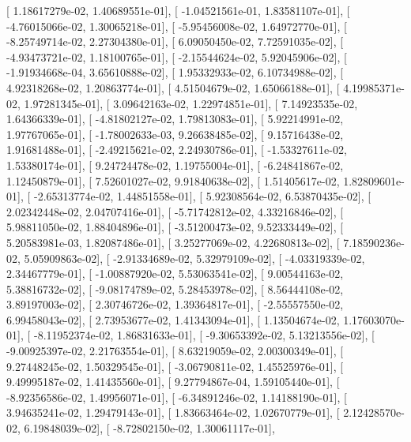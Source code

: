 \documentclass{article}
\begin{document}
       [  1.18617279e-02,   1.40689551e-01],
       [ -1.04521561e-01,   1.83581107e-01],
       [ -4.76015066e-02,   1.30065218e-01],
       [ -5.95456008e-02,   1.64972770e-01],
       [ -8.25749714e-02,   2.27304380e-01],
       [  6.09050450e-02,   7.72591035e-02],
       [ -4.93473721e-02,   1.18100765e-01],
       [ -2.15544624e-02,   5.92045906e-02],
       [ -1.91934668e-04,   3.65610888e-02],
       [  1.95332933e-02,   6.10734988e-02],
       [  4.92318268e-02,   1.20863774e-01],
       [  4.51504679e-02,   1.65066188e-01],
       [  4.19985371e-02,   1.97281345e-01],
       [  3.09642163e-02,   1.22974851e-01],
       [  7.14923535e-02,   1.64366339e-01],
       [ -4.81802127e-02,   1.79813083e-01],
       [  5.92214991e-02,   1.97767065e-01],
       [ -1.78002633e-03,   9.26638485e-02],
       [  9.15716438e-02,   1.91681488e-01],
       [ -2.49215621e-02,   2.24930786e-01],
       [ -1.53327611e-02,   1.53380174e-01],
       [  9.24724478e-02,   1.19755004e-01],
       [ -6.24841867e-02,   1.12450879e-01],
       [  7.52601027e-02,   9.91840638e-02],
       [  1.51405617e-02,   1.82809601e-01],
       [ -2.65313774e-02,   1.44851558e-01],
       [  5.92308564e-02,   6.53870435e-02],
       [  2.02342448e-02,   2.04707416e-01],
       [ -5.71742812e-02,   4.33216846e-02],
       [  5.98811050e-02,   1.88404896e-01],
       [ -3.51200473e-02,   9.52333449e-02],
       [  5.20583981e-03,   1.82087486e-01],
       [  3.25277069e-02,   4.22680813e-02],
       [  7.18590236e-02,   5.05909863e-02],
       [ -2.91334689e-02,   5.32979109e-02],
       [ -4.03319339e-02,   2.34467779e-01],
       [ -1.00887920e-02,   5.53063541e-02],
       [  9.00544163e-02,   5.38816732e-02],
       [ -9.08174789e-02,   5.28453978e-02],
       [  8.56444108e-02,   3.89197003e-02],
       [  2.30746726e-02,   1.39364817e-01],
       [ -2.55557550e-02,   6.99458043e-02],
       [  2.73953677e-02,   1.41343094e-01],
       [  1.13504674e-02,   1.17603070e-01],
       [ -8.11952374e-02,   1.86831633e-01],
       [ -9.30653392e-02,   5.13213556e-02],
       [ -9.00925397e-02,   2.21763554e-01],
       [  8.63219059e-02,   2.00300349e-01],
       [  9.27448245e-02,   1.50329545e-01],
       [ -3.06790811e-02,   1.45525976e-01],
       [  9.49995187e-02,   1.41435560e-01],
       [  9.27794867e-04,   1.59105440e-01],
       [ -8.92356586e-02,   1.49956071e-01],
       [ -6.34891246e-02,   1.14188190e-01],
       [  3.94635241e-02,   1.29479143e-01],
       [  1.83663464e-02,   1.02670779e-01],
       [  2.12428570e-02,   6.19848039e-02],
       [ -8.72802150e-02,   1.30061117e-01],
\end{document}
